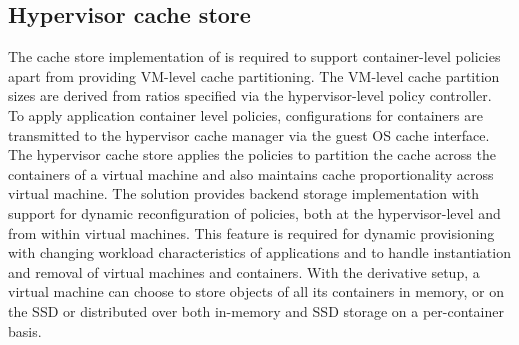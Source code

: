 \subsection{Hypervisor cache store}
%
The cache store implementation of \dd{} %
is required to support container-level policies apart from 
providing VM-level cache partitioning. 
%
The VM-level cache partition sizes are derived from 
ratios specified via the hypervisor-level policy controller.
%
To apply application container level policies, configurations for
containers are transmitted to the hypervisor cache manager
via the guest OS cache interface.
%
%
The hypervisor cache store applies the policies to partition the
cache across the containers of a virtual machine and also maintains
cache proportionality across virtual machine.
%
The \dd{} solution provides backend storage implementation with
support for dynamic reconfiguration of policies, both at the
hypervisor-level and from within virtual machines. 
%
This feature is required
for dynamic provisioning with changing workload characteristics of
applications and to handle instantiation and removal of virtual
machines and containers.
%
With the derivative setup, a virtual machine can choose to store
objects of all its containers in memory, or on the SSD or 
distributed over both in-memory and SSD storage 
on a per-container basis.
%

